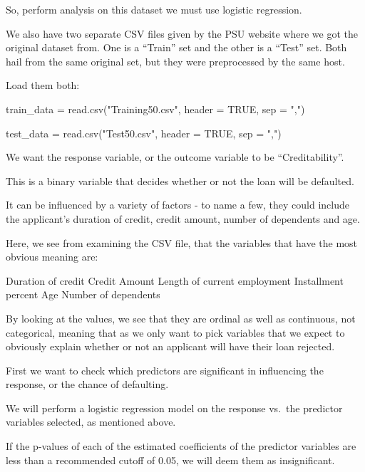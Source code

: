 \documentclass[
]{article}
\newenvironment{Shaded}{\begin{snugshade}}{\end{snugshade}}
\newcommand{\AttributeTok}[1]{\textcolor[rgb]{0.77,0.63,0.00}{#1}}
\newcommand{\ConstantTok}[1]{\textcolor[rgb]{0.00,0.00,0.00}{#1}}
\newcommand{\FunctionTok}[1]{\textcolor[rgb]{0.00,0.00,0.00}{#1}}
\newcommand{\NormalTok}[1]{#1}
\newcommand{\OtherTok}[1]{\textcolor[rgb]{0.56,0.35,0.01}{#1}}
\newcommand{\StringTok}[1]{\textcolor[rgb]{0.31,0.60,0.02}{#1}}
\begin{document}
So, perform analysis on this dataset we must use logistic regression.

We also have two separate CSV files given by the PSU website where we
got the original dataset from. One is a ``Train'' set and the other is a
``Test'' set. Both hail from the same original set, but they were
preprocessed by the same host.

Load them both:

\begin{Shaded}
\begin{Highlighting}[]
\NormalTok{train\_data }\OtherTok{=} \FunctionTok{read.csv}\NormalTok{(}\StringTok{"Training50.csv"}\NormalTok{, }
                \AttributeTok{header =} \ConstantTok{TRUE}\NormalTok{, }
                \AttributeTok{sep =} \StringTok{","}\NormalTok{)}

\NormalTok{test\_data }\OtherTok{=} \FunctionTok{read.csv}\NormalTok{(}\StringTok{"Test50.csv"}\NormalTok{, }
                \AttributeTok{header =} \ConstantTok{TRUE}\NormalTok{, }
                \AttributeTok{sep =} \StringTok{","}\NormalTok{)}
\end{Highlighting}
\end{Shaded}

We want the response variable, or the outcome variable to be
``Creditability''.

This is a binary variable that decides whether or not the loan will be
defaulted.

It can be influenced by a variety of factors - to name a few, they could
include the applicant's duration of credit, credit amount, number of
dependents and age.

Here, we see from examining the CSV file, that the variables that have
the most obvious meaning are:

Duration of credit Credit Amount Length of current employment
Installment percent Age Number of dependents

By looking at the values, we see that they are ordinal as well as
continuous, not categorical, meaning that as we only want to pick
variables that we expect to obviously explain whether or not an
applicant will have their loan rejected.

First we want to check which predictors are significant in influencing
the response, or the chance of defaulting.

We will perform a logistic regression model on the response vs.~the
predictor variables selected, as mentioned above.

If the p-values of each of the estimated coefficients of the predictor
variables are less than a recommended cutoff of 0.05, we will deem them
as insignificant.
\end{document}
